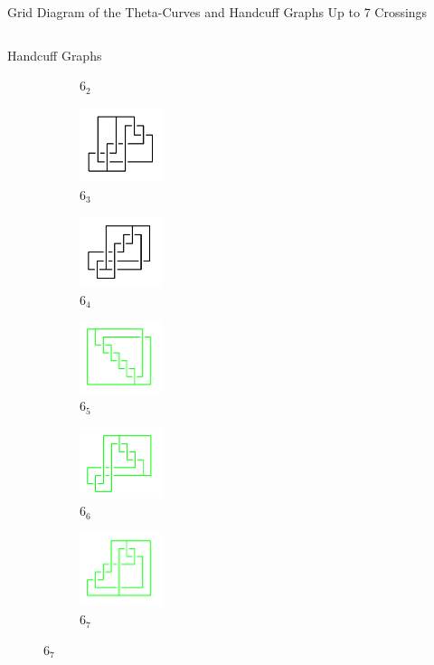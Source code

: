 \documentclass[final]{beamer}
\begin{document}
\begin{frame}[t]
\begin{alertblock}{Grid Diagram of the Theta-Curves and Handcuff Graphs Up to 7 Crossings}
\begin{columns}[t]
\begin{column}{0.3\textwidth}
\begin{alertblock}{Handcuff Graphs}
\begin{figure}
\begin{subfigure}{0.15\textwidth}
    \caption{$6_{2}$} 
    \end{subfigure}
    \begin{subfigure}{0.15\textwidth}
    \includegraphics[width=2.4cm]{../Midterm_Poster/grid_diagram/handcuff_6_3.png}
    \caption{$6_{3}$} 
    \end{subfigure}
    \begin{subfigure}{0.15\textwidth}
    \includegraphics[width=2.4cm]{../Midterm_Poster/grid_diagram/handcuff_6_4.png}
    \caption{$6_{4}$} 
    \end{subfigure}
    \begin{subfigure}{0.15\textwidth}
    \includegraphics[width=2.4cm]{../Midterm_Poster/grid_diagram/handcuff_6_5.png}
    \caption{$6_{5}$} 
    \end{subfigure}
    \begin{subfigure}{0.15\textwidth}
    \includegraphics[width=2.4cm]{../Midterm_Poster/grid_diagram/handcuff_6_6.png}
    \caption{$6_{6}$} 
    \end{subfigure}
    \begin{subfigure}{0.15\textwidth}
    \includegraphics[width=2.4cm]{../Midterm_Poster/grid_diagram/handcuff_6_7.png}
    \caption{$6_{7}$} 
    \end{subfigure}

\end{figure}
\end{alertblock}
\end{column}
\end{columns}
\end{alertblock}
\end{frame}
\end{document}

